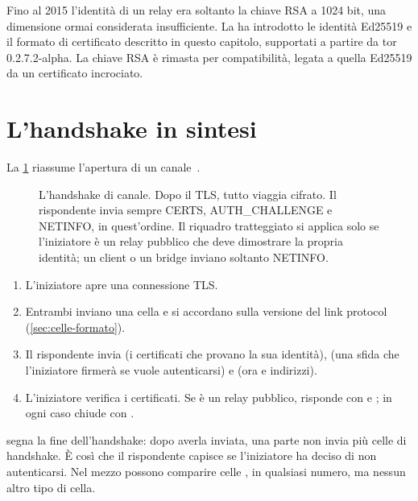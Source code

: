 \begin{storia}[Da RSA a Ed25519]
Fino al 2015 l'identità di un relay era soltanto la chiave RSA a 1024 bit, una dimensione ormai considerata insufficiente. La  ha introdotto le identità Ed25519 e il formato di certificato descritto in questo capitolo, supportati a partire da tor 0.2.7.2-alpha. La chiave RSA è rimasta per compatibilità, legata a quella Ed25519 da un certificato incrociato.
\end{storia}

\section{L'handshake in sintesi}\label{sec:canale-handshake}

La \cref{fig:handshake-canale} riassume l'apertura di un canale~.

\begin{figure}[htbp]
\centering

\caption{L'handshake di canale. Dopo il TLS, tutto viaggia cifrato. Il rispondente invia sempre CERTS, AUTH\_CHALLENGE e NETINFO, in quest'ordine. Il riquadro tratteggiato si applica solo se l'iniziatore è un relay pubblico che deve dimostrare la propria identità; un client o un bridge inviano soltanto NETINFO.}
\label{fig:handshake-canale}
\end{figure}

\begin{enumerate}
  \item L'iniziatore apre una connessione TLS.
  \item Entrambi inviano una cella  e si accordano sulla versione del link protocol (\cref{sec:celle-formato}).
  \item Il rispondente invia  (i certificati che provano la sua identità),  (una sfida che l'iniziatore firmerà se vuole autenticarsi) e  (ora e indirizzi).
  \item L'iniziatore verifica i certificati. Se è un relay pubblico, risponde con  e ; in ogni caso chiude con .
\end{enumerate}

 segna la fine dell'handshake: dopo averla inviata, una parte non invia più celle di handshake. È così che il rispondente capisce se l'iniziatore ha deciso di non autenticarsi. Nel mezzo possono comparire celle , in qualsiasi numero, ma nessun altro tipo di cella.

